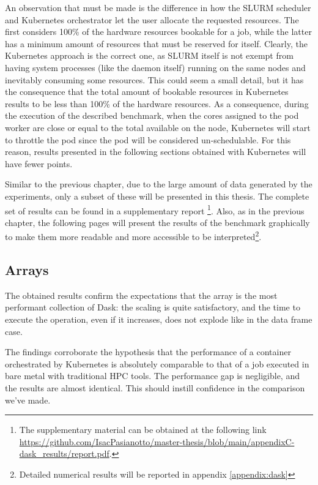 An observation that must be made is the difference in how the SLURM scheduler
and Kubernetes orchestrator let the user allocate the requested resources.
The first considers 100\% of the hardware resources bookable for a job, while
the latter has a minimum amount of resources that must be reserved for itself.
Clearly, the Kubernetes approach is the correct one, as SLURM itself is not
exempt from having system processes (like the daemon itself) running on the same
nodes and inevitably consuming some resources.
This could seem a small detail, but it has the consequence that the total amount
of bookable resources in Kubernetes results to be less than 100\% of the
hardware resources.
As a consequence, during the execution of the described benchmark, when the
cores assigned to the pod worker are close or equal to the total available on
the node, Kubernetes will start to throttle the pod since the pod will be
considered un-schedulable.
For this reason, results presented in the following sections obtained with
Kubernetes will have fewer points.

Similar to the previous chapter, due to the large amount of data generated by
the experiments, only a subset of these will be presented in this thesis.
The complete set of results can be found in a supplementary report \footnote {
  The supplementary material can be obtained at the following link
  \url{https://github.com/IsacPasianotto/master-thesis/blob/main/appendixC-dask_results/report.pdf}.}.
Also, as in the previous chapter, the following pages will present the results
of the benchmark graphically to make them more readable and more accessible to
be interpreted\footnote{Detailed numerical results will be reported in appendix
\ref{appendix:dask}}.


\subsection{Arrays}

The obtained results confirm the expectations that the array is the most
performant collection of Dask: the scaling is quite satisfactory, and the time
to execute the operation, even if it increases, does not explode like in the
data frame case.

The findings corroborate the hypothesis that the performance of a container
orchestrated by Kubernetes is absolutely comparable to that of a job executed in
bare metal with traditional HPC tools.
The performance gap is negligible, and the results are almost identical. This
should instill confidence in the comparison we've made.

